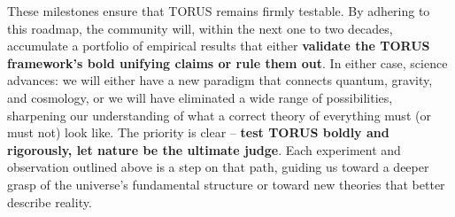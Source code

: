 \documentclass[
]{article}
\begin{document}
These milestones ensure that TORUS remains firmly testable. By adhering
to this roadmap, the community will, within the next one to two decades,
accumulate a portfolio of empirical results that either \textbf{validate
the TORUS framework's bold unifying claims or rule them out}. In either
case, science advances: we will either have a new paradigm that connects
quantum, gravity, and cosmology, or we will have eliminated a wide range
of possibilities, sharpening our understanding of what a correct theory
of everything must (or must not) look like. The priority is clear --
\textbf{test TORUS boldly and rigorously, let nature be the ultimate
judge}. Each experiment and observation outlined above is a step on that
path, guiding us toward a deeper grasp of the universe's fundamental
structure or toward new theories that better describe reality.
\end{document}
